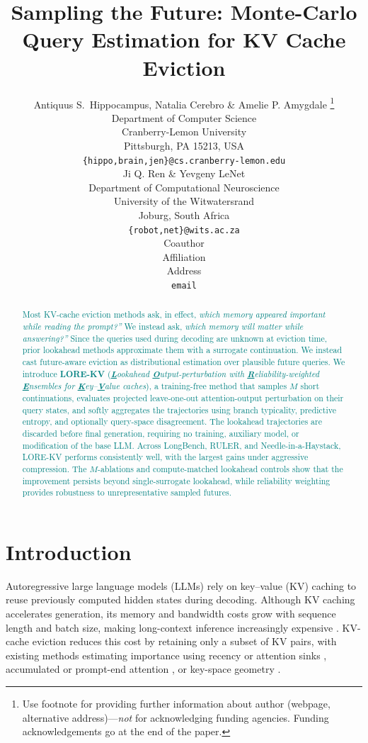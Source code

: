 \documentclass{article} %
\title{Sampling the Future: Monte-Carlo Query Estimation for KV Cache Eviction}
\author{Antiquus S.~Hippocampus, Natalia Cerebro \& Amelie P. Amygdale \thanks{ Use footnote for providing further information
about author (webpage, alternative address)---\emph{not} for acknowledging
funding agencies.  Funding acknowledgements go at the end of the paper.} \\
Department of Computer Science\\
Cranberry-Lemon University\\
Pittsburgh, PA 15213, USA \\
\texttt{\{hippo,brain,jen\}@cs.cranberry-lemon.edu} \\
\And
Ji Q. Ren \& Yevgeny LeNet \\
Department of Computational Neuroscience \\
University of the Witwatersrand \\
Joburg, South Africa \\
\texttt{\{robot,net\}@wits.ac.za} \\
\AND
Coauthor \\
Affiliation \\
Address \\
\texttt{email}
}
\begin{document}
\maketitle

\begin{abstract}

\textcolor{teal}{Most KV-cache eviction methods ask, in effect, \emph{which memory appeared important while reading the prompt?''} We instead ask, \emph{which memory will matter while answering?''} Since the queries used during decoding are unknown at eviction time, prior lookahead methods approximate them with a surrogate continuation. We instead cast future-aware eviction as distributional estimation over plausible future queries. We introduce \textbf{LORE-KV} (\emph{\textbf{\underline{L}}ookahead \textbf{\underline{O}}utput-perturbation with \textbf{\underline{R}}eliability-weighted \textbf{\underline{E}}nsembles for \textbf{\underline{K}}ey--\textbf{\underline{V}}alue caches}), a training-free method that samples $M$ short continuations, evaluates projected leave-one-out attention-output perturbation on their query states, and softly aggregates the trajectories using branch typicality, predictive entropy, and optionally query-space disagreement. The lookahead trajectories are discarded before final generation, requiring no training, auxiliary model, or modification of the base LLM. Across LongBench, RULER, and Needle-in-a-Haystack, LORE-KV performs consistently well, with the largest gains under aggressive compression. The $M$-ablations and compute-matched lookahead controls show that the improvement persists beyond single-surrogate lookahead, while reliability weighting provides robustness to unrepresentative sampled futures.}

\end{abstract}


\section{Introduction}
\label{sec:introduction}
Autoregressive large language models (LLMs) rely on key--value (KV) caching to reuse previously computed hidden states during decoding. Although KV caching accelerates generation, its memory and bandwidth costs grow with sequence length and batch size, making long-context inference increasingly expensive \citep{behnam2025rocketkv,li2025kvtuner,lancucki2025hyperscaling}. KV-cache eviction reduces this cost by retaining only a subset of KV pairs, with existing methods estimating importance using recency or attention sinks \citep{xiao2023streamingllm}, accumulated or prompt-end attention \citep{zhang2023h2o,liu2023scissorhands,li2024snapkv}, or key-space geometry \citep{devoto2024simple,park2026keydiff}.
\end{document}

